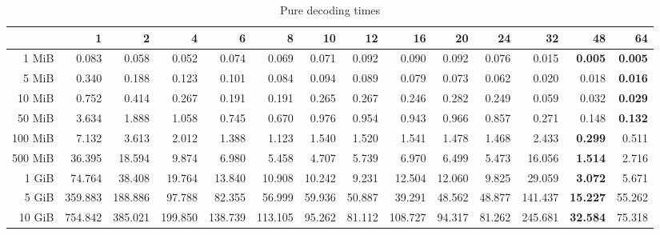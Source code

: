 \begin{table}[!h]
	\centering
	\caption{Pure decoding times}
	\begin{tabular}{rrrrrrrrrrrrrr}
		\toprule
		\diagbox[width=7em]{Size}{Threads} &      1  &      2  &      4  &      6  &      8  &     10 &     12 &      16 &     20 &     24 &      32 &     48 &     64 \\
		\midrule
		1 MiB   &   0.083 &   0.058 &   0.052 &   0.074 &   0.069 &  0.071 &  0.092 &   0.090 &  0.092 &  0.076 &   0.015 &  \textbf{0.005} &  \textbf{0.005} \\
		5 MiB   &   0.340 &   0.188 &   0.123 &   0.101 &   0.084 &  0.094 &  0.089 &   0.079 &  0.073 &  0.062 &   0.020 &  0.018 &  \textbf{0.016} \\
		10 MiB  &   0.752 &   0.414 &   0.267 &   0.191 &   0.191 &  0.265 &  0.267 &   0.246 &  0.282 &  0.249 &   0.059 &  0.032 &  \textbf{0.029} \\
		50 MiB  &   3.634 &   1.888 &   1.058 &   0.745 &   0.670 &  0.976 &  0.954 &   0.943 &  0.966 &  0.857 &   0.271 &  0.148 &  \textbf{0.132} \\
		100 MiB &   7.132 &   3.613 &   2.012 &   1.388 &   1.123 &  1.540 &  1.520 &   1.541 &  1.478 &  1.468 &   2.433 &  \textbf{0.299} &  0.511 \\
		500 MiB &  36.395 &  18.594 &   9.874 &   6.980 &   5.458 &  4.707 &  5.739 &   6.970 &  6.499 &  5.473 &  16.056 &  \textbf{1.514} &  2.716 \\
		1 GiB   &  74.764 &  38.408 &  19.764 &  13.840 &  10.908 & 10.242 &  9.231 &  12.504 & 12.060 &  9.825 &  29.059 &  \textbf{3.072} &  5.671 \\
		5 GiB   & 359.883 & 188.886 &  97.788 &  82.355 &  56.999 & 59.936 & 50.887 &  39.291 & 48.562 & 48.877 & 141.437 & \textbf{15.227} & 55.262 \\
		10 GiB  & 754.842 & 385.021 & 199.850 & 138.739 & 113.105 & 95.262 & 81.112 & 108.727 & 94.317 & 81.262 & 245.681 & \textbf{32.584} & 75.318 \\
		\bottomrule
	\end{tabular}
\end{table}

